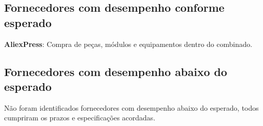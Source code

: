 \subsection{Fornecedores com desempenho conforme esperado}
\textbf{AliexPress}: Compra de peças, módulos e equipamentos dentro do combinado.

\subsection{Fornecedores com desempenho abaixo do esperado}
Não foram identificados fornecedores com desempenho abaixo do esperado, todos cumpriram os prazos e especificações acordadas.






